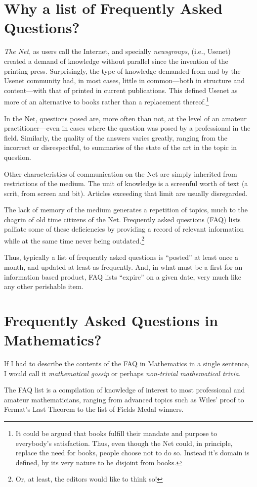 \section{Why a list of Frequently Asked Questions?}

\emph{The Net}, as users call the Internet, and specially
\emph{newsgroups}, (i.e., Usenet) created a demand of knowledge without
parallel since the invention of the printing press.  Surprisingly, the
type of knowledge demanded from and by the Usenet community had, in most
cases, little in common---both in structure and content---with that of
printed in current publications. This defined Usenet as more of an
alternative to books rather than a replacement thereof.\footnote{It
  could be argued that books fulfill their mandate and purpose to
  everybody's satisfaction.  Thus, even though the Net could, in
  principle, replace the need for books, people choose not to do
  so. Instead it's domain is defined, by its very nature to be disjoint
  from books.}

In the Net, questions posed are, more often than not, at the level of an
amateur practitioner---even in cases where the question was posed by a
professional in the field. Similarly, the quality of the answers varies
greatly, ranging from the incorrect or disrespectful, to summaries of
the state of the art in the topic in question.

Other characteristics of communication on the Net are simply inherited
from restrictions of the medium. The unit of knowledge is a screenful
worth of text (a scrit, from screen and bit). Articles exceeding that
limit are usually disregarded.

The lack of memory of the medium generates a repetition of topics, much
to the chagrin of old time citizens of the Net.  Frequently asked
questions (FAQ) lists palliate some of these deficiencies by providing a
record of relevant information while at the same time never being
outdated.\footnote{Or, at least, the editors would like to think so!}

Thus, typically a list of frequently asked questions is ``posted'' at
least once a month, and updated at least as frequently. And, in what
must be a first for an information based product, FAQ lists ``expire''
on a given date, very much like any other perishable item.


\section{Frequently Asked Questions in Mathematics?}

If I had to describe the contents of the FAQ in Mathematics in a single
sentence, I would call it \emph{mathematical gossip} or perhaps
\emph{non-trivial mathematical trivia}.

The FAQ list is a compilation of knowledge of interest to most
professional and amateur mathematicians, ranging from advanced topics
such as Wiles' proof to Fermat's Last Theorem to the list of Fields
Medal winners.

